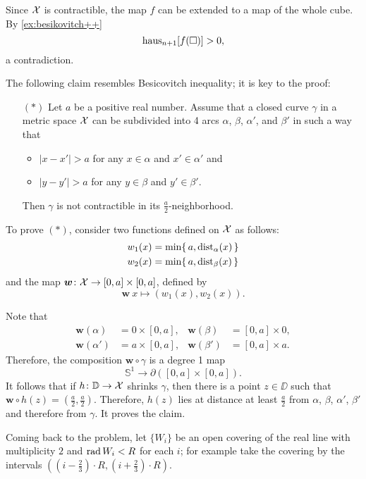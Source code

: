 Since $\mathcal{X}$ is contractible, the map $f$ can be extended to a map of the whole cube.
By \ref{ex:besikovitch++} 
\[\mathrm{haus}_{n+1}[f(\square)]>0,\]
a contradiction.


The following claim resembles Besicovitch inequality;
it is key to the proof:
\begin{itemize}
 \item[$({*})$] Let $a$ be a positive real number.
 Assume that a closed curve $\gamma$ in a metric space $\mathcal{X}$ can be subdivided into 4 arcs $\alpha$, $\beta$, $\alpha'$, and $\beta'$ in such a way that 
 \begin{itemize}
 \item $|x-x'|>a$ for any $x\in\alpha$ and $x'\in \alpha'$
 and
 \item $|y-y'|>a$ for any $y\in\beta$ and $y'\in \beta'$.
 \end{itemize}
 Then $\gamma$ is not contractible in its $\tfrac a2$-neighborhood.
\end{itemize}

To prove $({*})$, consider two functions defined on $\mathcal{X}$ as follows:
\begin{align*}
w_1(x)&=\min \{\,a,\mathrm{dist}_{\alpha}(x)\,\}
\\
w_2(x)&=\min \{\,a,\mathrm{dist}_{\beta}(x)\,\}
\end{align*}
and the map $\bm{w}\colon\mathcal{X}\to [0,a]\times[0,a]$, defined by
\[\bm{w}\:x\mapsto(w_1(x),w_2(x)).\]

Note that 
\begin{align*}
\bm{w}(\alpha)&=0\times [0,a],
&
\bm{w}(\beta)&=[0,a]\times 0,
\\
\bm{w}(\alpha')&=a\times [0,a],
&
\bm{w}(\beta')&=[0,a]\times a.
\end{align*} 
Therefore, the composition $\bm{w}\circ\gamma$ is a degree 1 map 
\[\mathbb{S}^1\to \partial([0,a]\times[0,a]).\] 
It follows that if $h\colon\mathbb{D}\to \mathcal{X}$ shrinks $\gamma$, then there is a point $z\in\DD$ such that 
$\bm{w}\circ h(z)=(\tfrac a2,\tfrac a2)$.
Therefore, $h(z)$ lies at distance at least $\tfrac a2$ from $\alpha$, $\beta$, $\alpha'$, $\beta'$
and therefore from $\gamma$.
It proves the claim.

\medskip

Coming back to the problem, let $\{W_i\}$ be an open covering of the real line with multiplicity $2$ and $\mathop{\rm rad}\nolimits W_i<R$ for each $i$;
for example take the covering by the intervals $((i-\tfrac23)\cdot R,(i+\tfrac23)\cdot R)$.

